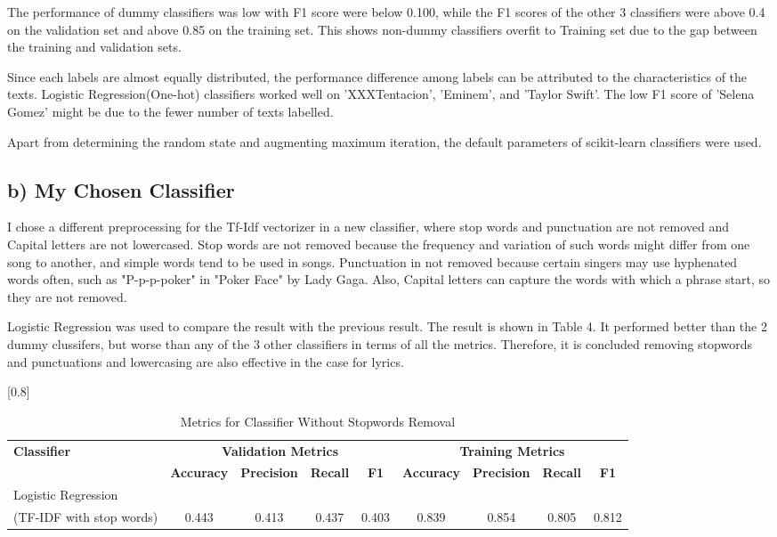 \documentclass[a4paper,11pt]{article}
\begin{document}
The performance of dummy classifiers was low with F1 score were below 0.100,
while the F1 scores of the other 3 classifiers were above 0.4 on the validation set
and above 0.85 on the training set.
This shows non-dummy classifiers overfit to Training set due to the gap between the training and validation sets.

Since each labels are almost equally distributed, the performance difference among labels can be attributed to the characteristics of the texts.
Logistic Regression(One-hot) classifiers worked well on 'XXXTentacion', 'Eminem', and 'Taylor Swift'.
The low F1 score of 'Selena Gomez' might be due to the fewer number of texts labelled.

Apart from determining the random state and augmenting maximum iteration, the default parameters of scikit-learn classifiers were used.


\subsection{b) My Chosen Classifier}
I chose a different preprocessing for the Tf-Idf vectorizer in a new classifier, where stop words and punctuation are not removed and Capital letters are not lowercased.
Stop words are not removed because the frequency and variation of such words might differ from one song to another, and simple words tend to be used in songs.
Punctuation in not removed because certain singers may use hyphenated words often, such as "P-p-p-poker" in "Poker Face" by Lady Gaga. 
Also, Capital letters can capture the words with which a phrase start, so they are not removed.

Logistic Regression was used to compare the result with the previous result.
The result is shown in Table 4.
It performed better than the 2 dummy clussifers, but worse than any of the 3 other classifiers in terms of all the metrics.
Therefore, it is concluded removing stopwords and punctuations and lowercasing are also effective in the case for lyrics.




\begin{table}[htbp]
    \centering
    \caption{Metrics for Classifier Without Stopwords Removal}
    \scalebox{0.8}[0.8]{
    \begin{tabular}{l|cccc|cccc}
        \hline
        \textbf{Classifier} & \multicolumn{4}{c|}{\textbf{Validation Metrics}} & \multicolumn{4}{c}{\textbf{Training Metrics}} \\
        & \textbf{Accuracy} & \textbf{Precision} & \textbf{Recall} & \textbf{F1} & \textbf{Accuracy} & \textbf{Precision} & \textbf{Recall} & \textbf{F1} \\
        \hline 
        Logistic Regression &&&&&& \\ (TF-IDF with stop words) & 0.443 & 0.413 & 0.437 & 0.403 & 0.839 & 0.854 & 0.805 & 0.812 \\
        \hline
    \end{tabular}
    }
\end{table}
\end{document}
